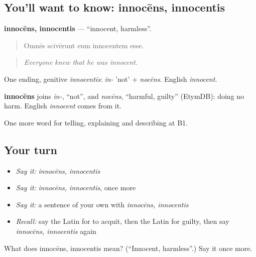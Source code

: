 \subsection*{You'll want to know: innocēns, innocentis}
\textbf{innocēns, innocentis} — \textquotedblleft{}innocent, harmless\textquotedblright{}.

\begin{quote}
Omnēs scīvērunt eum innocentem esse.
\end{quote}

\begin{quote}
\emph{Everyone knew that he was innocent.}
\end{quote}

One ending, genitive \emph{innocentis}: \emph{in-} 'not' + \emph{nocēns}. English \emph{innocent}.

\begin{cousinweb}
\textbf{innocēns} joins \emph{in-}, \textquotedblleft{}not\textquotedblright{}, and \emph{nocēns}, \textquotedblleft{}harmful, guilty\textquotedblright{} (EtymDB): doing no harm. English \emph{innocent} comes from it.
\end{cousinweb}

\begin{grammarlens}[title={What you've built}]
One more word for telling, explaining and describing at B1.
\end{grammarlens}

\subsection*{Your turn}
\begin{itemize}
\raggedright
  \item \emph{Say it:} \emph{innocēns, innocentis}
  \item \emph{Say it:} \emph{innocēns, innocentis}, once more
  \item \emph{Say it:} a sentence of your own with \emph{innocēns, innocentis}
  \item \emph{Recall:} say the Latin for to acquit, then the Latin for guilty, then say \emph{innocēns, innocentis} again
\end{itemize}

\begin{tcolorbox}[breakable,colback=teal!4,colframe=teal!35!black,title={Before you move on}]
What does innocēns, innocentis mean? (\textquotedblleft{}Innocent, harmless\textquotedblright{}.) Say it once more.
\end{tcolorbox}

